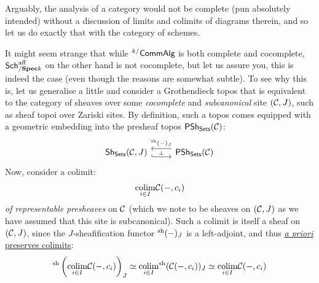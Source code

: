                     Arguably, the analysis of a category would not be complete (pun absolutely intended) without a discussion of limits and colimits of diagrams therein, and so let us do exactly that with the category of schemes.
                    
                    \begin{remark} \label{remark: affine_scheme_colimits} 
                    It might seem strange that while ${}^{k/}\mathsf{Comm}\mathsf{Alg}$ is both complete and cocomplete, $\mathsf{Sch}^{\mathrm{aff}}_{/\mathbf{Spec} k}$ on the other hand is not cocomplete, but let us assure you, this is indeed the case (even though the reasons are somewhat subtle). To see why this is, let us generalise a little and consider a Grothendieck topos that is equivalent to the category of sheaves over some \textit{cocomplete} and \textit{subcanonical} site $(\mathcal{C}, J)$, such as sheaf topoi over Zariski sites. By definition, such a topos comes equipped with a geometric embedding into the presheaf topos $\mathsf{PSh}_{\mathsf{Sets}}(\mathcal{C})$:
                        $$
                            \begin{tikzcd}
                            	\Sh_{\Sets}(\C, J) & {\Psh_{\Sets}(\C)}
                            	\arrow[""{name=0, anchor=center, inner sep=0}, shift right=2, hook, from=1-1, to=1-2]
                            	\arrow[""{name=1, anchor=center, inner sep=0}, "{}^{\sh}(-)_J"', shift right=2, from=1-2, to=1-1]
                            	\arrow["\dashv"{anchor=center, rotate=-90}, draw=none, from=1, to=0]
                            \end{tikzcd}
                        $$
                    Now, consider a colimit:
                        $$\underset{i \in I}{\operatorname{colim}} \mathcal{C}(-, c_i)$$
                    \textit{of representable presheaves} on $\mathcal{C}$ (which we note to be sheaves on $(\mathcal{C}, J)$ as we have assumed that this site is subcanonical). Such a colimit is itself a sheaf on $(\mathcal{C}, J)$, since the $J$-sheafification functor ${}^{\mathrm{sh}}(-)_J$ is a left-adjoint, and thus \href{https://ncatlab.org/nlab/show/adjoints+preserve+\%28co-\%29limits}{\underline{\textit{a priori} preserves colimits}}:
                        $${}^{\mathrm{sh}}\left(\underset{i \in I}{\operatorname{colim}} \mathcal{C}(-, c_i)\right)_J \simeq \underset{i \in I}{\operatorname{colim}} {}^{\mathrm{sh}}(\mathcal{C}(-, c_i))_J \simeq \underset{i \in I}{\operatorname{colim}} \mathcal{C}(-, c_i)$$

\end{remark}

